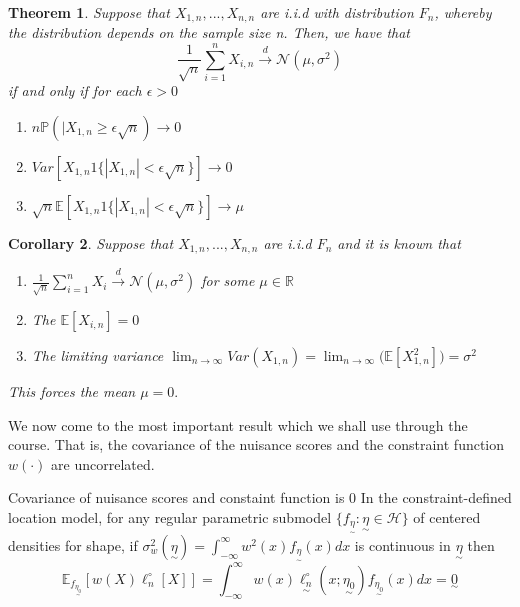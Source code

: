 \documentclass[twoside]{article}
\newcounter{lecnum}
\newtheorem{theorem}{Theorem}[lecnum]
\newtheorem{corollary}[theorem]{Corollary}
\newcommand{\real}{\mathbb{R}}
\newcommand{\prob}{\mathbb{P}}
\newcommand{\utilde}{\underset{\sim}}
\begin{document}
\begin{theorem} Suppose that $X_{1,n}, ... , X_{n,n}$ are i.i.d with distribution $F_n$, whereby the distribution depends on the sample size n. Then, we have that 
\begin{equation}
    \frac{1}{\sqrt{n}}\sum_{i=1}^{n}X_{i,n} \xrightarrow{d} \mathcal{N}(\mu, \sigma^2)
\end{equation}
if and only if for each $\epsilon > 0$ 
\begin{enumerate}
    \item $n\prob(|X_{1,n} \geq \epsilon \sqrt{n}) \rightarrow 0$
    \item $Var[X_{1,n}1\{|X_{1,n}| < \epsilon \sqrt{n}\}] \rightarrow 0$
    \item $\sqrt{n}\mathbb{E}[X_{1,n}1\{|X_{1,n}| < \epsilon \sqrt{n}\}] \rightarrow \mu$
\end{enumerate}    
\end{theorem}

\begin{corollary}
Suppose that $X_{1,n}, ..., X_{n,n}$ are i.i.d $F_n$ and it is known that 
\begin{enumerate}
    \item $\frac{1}{\sqrt{n}}\sum_{i=1}^{n}X_i \xrightarrow{d} \mathcal{N}(\mu, \sigma^2)$ for some $\mu \in \real$
    \item The $\mathbb{E}[X_{i,n}] = 0$
    \item The limiting variance $\lim_{n \rightarrow \infty}Var(X_{1,n}) = \lim_{n \rightarrow \infty}\big(\mathbb{E}[X_{1,n}^2] \big) = \sigma^2$
\end{enumerate}
This forces the mean $\mu = 0.$
\end{corollary}


We now come to the most important result which we shall use through the course. That is, the covariance of the nuisance scores and the constraint function $w(\cdot)$ are uncorrelated.

\begin{theorem_exam}{Covariance of nuisance scores and constaint function is 0}{} In the constraint-defined location model, for any regular parametric submodel $\{f_{\utilde{\eta}}: \utilde{\eta} \in \mathcal{H}\}$ of centered densities for shape, if $\sigma_{w}^{2}(\utilde{\eta}) = \int_{-\infty}^{\infty}w^2(x)f_{\utilde{\eta}}(x)dx$ is continuous in $\utilde{\eta}$ then 
\begin{equation} 
    \mathbb{E}_{f_{\utilde{\eta_{0}}}}[w(X)\ell_{n}^{\circ}[X]] = \int_{-\infty}^{\infty}w(x)\utilde{{\ell}_{n}^{\circ}}(x; \utilde{\eta_{0}})f_{\utilde{\eta_{0}}}(x)dx = \utilde{0}
\end{equation}
\end{theorem_exam}
\end{document}
